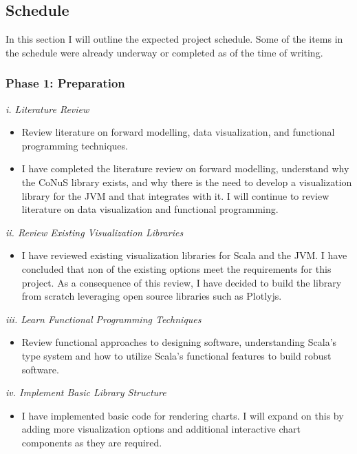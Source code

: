 \documentclass[12pt]{article}
\begin{document}
\subsection{Schedule}
In this section I will outline the expected project schedule. Some of the items in the schedule were already underway or completed as of the time of writing.

\subsubsection{Phase 1: Preparation}

\textit{i. Literature Review}

\begin{itemize}
\item Review literature on forward modelling, data visualization, and functional programming techniques.

\item I have completed the literature review on forward modelling, understand why the CoNuS library exists, and why there is the need to develop a visualization library for the JVM and that integrates with it. I will continue to review literature on data visualization and functional programming.
\end{itemize}

\textit{ii. Review Existing Visualization Libraries}

\begin{itemize}
\item I have reviewed existing visualization libraries for Scala and the JVM. I have concluded that non of the existing options meet the requirements for this project. As a consequence of this review, I have decided to build the library from scratch leveraging open source libraries such as Plotlyjs.
\end{itemize}

\textit{iii. Learn Functional Programming Techniques}

\begin{itemize}

\item Review functional approaches to designing software, understanding Scala's type system and how to utilize Scala's functional features to build robust software.
 
\end{itemize}

\textit{iv. Implement Basic Library Structure}

\begin{itemize}

\item I have implemented basic code for rendering charts. I will expand on this by adding more visualization options and additional interactive chart components as they are required.
	
\end{itemize}
\end{document}
